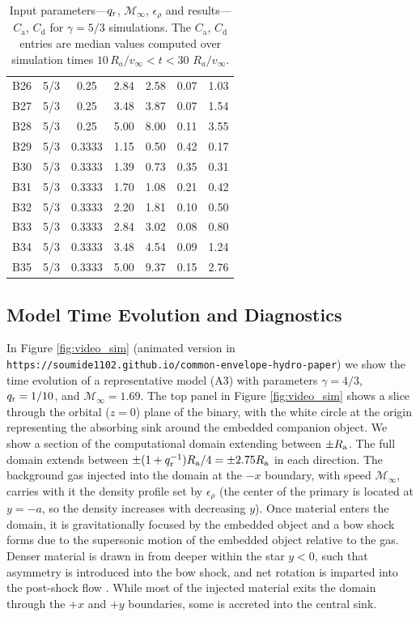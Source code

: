 \begin{table}[t]
{{\begin{tabular}{lcccccc}
B26 & 5/3 & 0.25 & 2.84 & 2.58 & 0.07 & 1.03 \\
B27 & 5/3 & 0.25 & 3.48 & 3.87 & 0.07 & 1.54 \\
B28 & 5/3 & 0.25 & 5.00 & 8.00 & 0.11 & 3.55 \\
B29 & 5/3 & 0.3333 & 1.15 & 0.50 & 0.42 & 0.17 \\
B30 & 5/3 & 0.3333 & 1.39 & 0.73 & 0.35 & 0.31 \\
B31 & 5/3 & 0.3333 & 1.70 & 1.08 & 0.21 & 0.42 \\
B32 & 5/3 & 0.3333 & 2.20 & 1.81 & 0.10 & 0.50 \\
B33 & 5/3 & 0.3333 & 2.84 & 3.02 & 0.08 & 0.80 \\
B34 & 5/3 & 0.3333 & 3.48 & 4.54 & 0.09 & 1.24 \\
B35 & 5/3 & 0.3333 & 5.00 & 9.37 & 0.15 & 2.76 \\
\hline
\end{tabular}
}}
\caption{Input parameters---$q_{\rm r}$, $\mathcal M_\infty$, $\epsilon_\rho$ and results---$C_{\mathrm a}$, $C_{\mathrm d}$ for $\gamma = 5/3$ simulations. The $C_\mathrm{a}$, $C_\mathrm{d}$ entries are median values computed over simulation times $10 \, R_a / v_\infty < t < 30$ $R_a / v_\infty$.}
\label{tab:sims_53_params}
\end{table}

\subsection{Model Time Evolution and Diagnostics}

In Figure \ref{fig:video_sim} (animated version in \newline  \verb"https://soumide1102.github.io/common-envelope-hydro-paper") we show the time evolution of a representative model (A3) with parameters $\gamma = 4/3$, $q_{\rm r} = 1/10$, and  $\mathcal{M}_\infty = 1.69$. The top panel in Figure \ref{fig:video_sim} shows a slice through the orbital ($z = 0$) plane of the binary, with the white circle at the origin representing the absorbing sink around the embedded companion object. We show a section of the computational domain extending between $\pm R_{\rm a}$. The full domain extends between $\pm (1 + q_{\rm r}^{-1}) R_{\mathrm{a}}/4 = \pm 2.75 R_{\rm a}$ in each direction. The background gas injected into the domain at the $-x$ boundary, with speed $\mathcal{M}_\infty$, carries with it the density profile set by $\epsilon_\rho$ (the center of the primary is located at $y = - a$, so the density increases with decreasing $y$). Once material enters the domain, it is gravitationally focused by the embedded object and a bow shock forms due to the supersonic motion of the embedded object relative to the gas. Denser material is drawn in from deeper within the star $y<0$, such that asymmetry is introduced into the bow shock, and net rotation is imparted into the post-shock flow \cite{MacLeod_2015,MacLeod:2017}. While most of the injected material exits the domain through the $+x$ and $+y$ boundaries, some is accreted into the central sink. 


